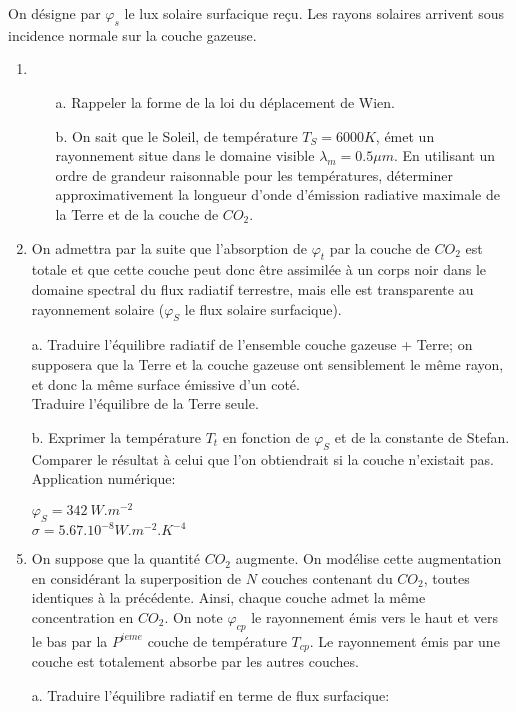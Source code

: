 \documentclass{article}
\begin{document}
On désigne par $\varphi_{s}$ le lux solaire surfacique reçu. Les rayons solaires arrivent sous incidence normale sur la couche gazeuse.
\begin{enumerate}
\item \begin{enumerate}
\item[a.] Rappeler la forme de la loi du déplacement de Wien.
\item[b.] On sait que le Soleil, de température $T_{S}=6000K$, émet un rayonnement situe dans le domaine visible $\lambda_{m}=0.5\mu m$. En utilisant un ordre de grandeur raisonnable pour les températures, déterminer approximativement la longueur d'onde d'émission radiative maximale de la Terre et de la couche de $CO_{2}$.
\end{enumerate}
\item On admettra par la suite que l'absorption de $\varphi_{t}$ par la couche de $CO_{2}$ est totale et que cette couche peut donc être assimilée à un corps noir dans le domaine spectral du flux radiatif terrestre, mais elle est transparente au rayonnement solaire ($\varphi_{S}$ le flux solaire surfacique).
\item[a.] Traduire l'équilibre radiatif de l'ensemble {couche gazeuse + Terre}; on supposera que la Terre et la couche gazeuse ont sensiblement le même rayon, et donc la même surface émissive d'un coté.\\
Traduire l'équilibre de la Terre seule.
\item[b.] Exprimer la température $T_{t}$ en fonction de $\varphi_{S}$ et de la constante de Stefan. Comparer le résultat à celui que l'on obtiendrait si la couche n'existait pas.\\
Application numérique:
\begin{center}
$\varphi_{S}=342~W.m^{-2}$\\
$\sigma=5.67.10^{-8}W.m^{-2}.K^{-4}$
\end{center}
\item On suppose que la quantité $CO_{2}$ augmente. On modélise cette augmentation en considérant la superposition de $N$ couches contenant du $CO_{2}$, toutes identiques à la précédente. Ainsi, chaque couche admet la même concentration en $CO_{2}$. On note $\varphi_{cp}$ le rayonnement émis vers le haut et vers le bas par la $P^{ieme}$ couche de température $T_{cp}$. Le rayonnement émis par une couche est totalement absorbe par les autres couches.
\item[a.] Traduire l'équilibre radiatif en terme de flux surfacique:
\begin{enumerate}

\end{enumerate}
\end{enumerate}
\end{document}
